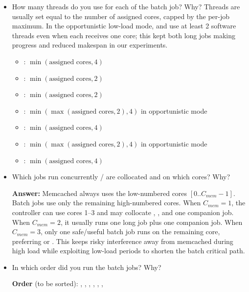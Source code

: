 \begin{enumerate}
\begin{itemize}
    \item How many threads do you use for each of the batch job? Why?
Threads are usually set equal to the number of assigned cores, capped by the per-job maximum. In the opportunistic low-load mode,  and  use at least 2 software threads even when each receives one core; this kept both long jobs making progress and reduced makespan in our experiments.

\begin{itemize}
    \item {}: $\min(\text{assigned cores},4)$
    \item {}: $\min(\text{assigned cores},2)$
    \item {}: $\min(\text{assigned cores},2)$
    \item {}: $\min(\max(\text{assigned cores},2),4)$ in opportunistic mode
    \item {}: $\min(\text{assigned cores},4)$
    \item {}: $\min(\max(\text{assigned cores},2),4)$ in opportunistic mode
    \item {}: $\min(\text{assigned cores},4)$
\end{itemize}

      
    \item Which jobs run concurrently / are collocated and on which cores? Why?

    \textbf{Answer:}
Memcached always uses the low-numbered cores $[0..C_{mem}-1]$. Batch jobs use only the remaining high-numbered cores. When $C_{mem}=1$, the controller can use cores 1--3 and may collocate , , and one companion job. When $C_{mem}=2$, it usually runs one long job plus one companion job. When $C_{mem}=3$, only one safe/useful batch job runs on the remaining core, preferring  or . This keeps risky interference away from memcached during high load while exploiting low-load periods to shorten the batch critical path.

    \item In which order did you run the batch jobs? Why?

\textbf{Order} (to be sorted):
, , ,
, , , 






\end{itemize}
\end{enumerate}
